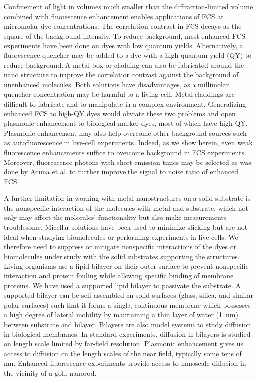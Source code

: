 Confinement of light in volumes much smaller than the diffraction-limited volume combined with fluorescence enhancement enables applications of FCS at micromolar dye concentrations.
The correlation contrast in FCS decays as the square of the background intensity.\cite{fradin2003fluorescence}
To reduce background, most enhanced FCS experiments have been done on dyes with low quantum yields.\cite{kinkhabwala2012fluorescence,estrada200810000}
Alternatively, a fluorescence quencher may be added to a dye with a high quantum yield (QY) to reduce background.\cite{punj2013a,punj2013gold}
A metal box or cladding\cite{ghenuche2015matching} can also be fabricated around the nano structure to improve the correlation contrast against the background of unenhanced molecules.
Both solutions have disadvantages, as a millimolar quencher concentration may be harmful to a living cell.
Metal claddings are difficult to fabricate and to manipulate in a complex environment.
Generalizing enhanced FCS to high-QY dyes would obviate these two problems and open plasmonic enhancement to biological marker dyes, most of which have high QY.
Plasmonic enhancement may also help overcome other background sources such as autofluorescence in live-cell experiments.
Indeed, as we show herein, even weak fluorescence enhancements suffice to overcome background in FCS experiments.
Moreover, fluorescence photons with short emission times may be selected as was done by Acuna et al.\cite{acuna2012fluorescence} to further improve the signal to noise ratio of enhanced FCS.


A further limitation in working with metal nanostructures on a solid substrate is the nonspecific interaction of the molecules with metal and substrate, which not only may affect the molecules’ functionality but also make measurements troublesome.\cite{kinkhabwala2012fluorescence,yuan2013thousandfold,zhang2009gold}
Micellar solutions have been used to minimize sticking but are not ideal when studying biomolecules or performing experiments in live cells. 
We therefore need to suppress or mitigate nonspecific interactions of the dyes or biomolecules under study with the solid substrates supporting the structures.
Living organisms use a lipid bilayer on their outer surface to prevent nonspecific interaction and protein fouling while allowing specific binding of membrane proteins.\cite{zhang2009gold,cooper2000cell}
We have used a supported lipid bilayer to passivate the substrate.\cite{persson2012lipidbased,ller2012single,lohmuller2011supported}
A supported bilayer can be self-assembled on solid surfaces (glass, silica, and similar polar surfaces) such that it forms a single, 
continuous membrane which possesses a high degree of lateral mobility by maintaining a thin layer of water (\SI{1}{\nm}) between substrate and bilayer.\cite{sackmann1996supported,CASTELLANA2006429,cremer1999formation,richter2006formation} 
Bilayers are also model systems to study diffusion in biological membranes.
In standard experiments, diffusion in bilayers is studied on length scale limited by far-field resolution. Plasmonic enhancement gives us access to diffusion on the length scales of the near field, typically some tens of nm.
Enhanced fluorescence experiments provide access to nanoscale diffusion in the vicinity of a gold nanorod.


